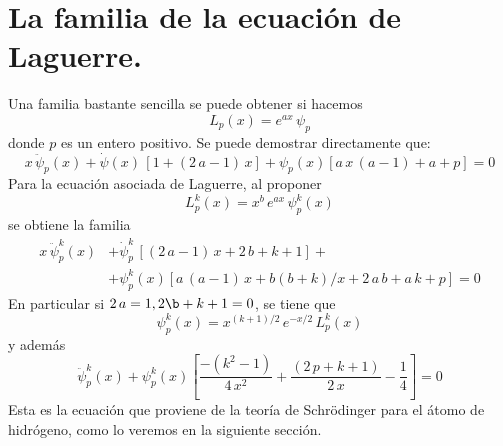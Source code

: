 \section{La familia de la ecuación de Laguerre.}
Una familia bastante sencilla se puede obtener si hacemos
\[ L_{p} (x) = e^{a x} \, \psi_{p} \]
donde $p$ es un entero positivo. Se puede demostrar directamente que:
\[ x \, \ddot{\psi}_{p} (x) + \dot{\psi} (x) \, [1 + (2 \, a -1) \, x] + \psi_{p} (x) [a \, x \, (a - 1) + a + p] = 0  \]
Para la ecuación asociada de Laguerre, al proponer
\[ L_{p}^{k} (x) = x^{b} \, e^{a x} \, \psi_{p}^{k} (x) \]
se obtiene la familia
\begin{align*}
x \, \ddot{\psi}_{p}^{k} (x) &+ \dot{\psi}_{p}^{k} \, [(2 \, a -1) \, x  + 2 \, b + k + 1] + \\
&+ \psi_{p}^{k} (x) [ a \, (a - 1) \, x + b (b + k) / x + 2 \, a \, b + a \, k + p] = 0
\end{align*}
En particular si $2 \, a = 1, 2 \b + k + 1 = 0$, se tiene que
\begin{equation}
\psi_{p}^{k} (x) = x^{(k+1)/2} \, e^{-x/2} \, L_{p}^{k} (x)
\label{eq:ecuacion_08_80}
\end{equation}
y además
\begin{equation}
\ddot{\psi}_{p}^{k} (x) + \psi_{p}^{k} (x) \left[ \dfrac{-(k^{2} - 1)}{4 \, x^{2}} + \dfrac{(2 \, p + k + 1)}{2 \, x} - \dfrac{1}{4} \right] = 0
\label{eq:ecuacion_08_81}
\end{equation}
Esta es la ecuación que proviene de la teoría de Schrödinger para el átomo de hidrógeno, como lo veremos en la siguiente sección.


